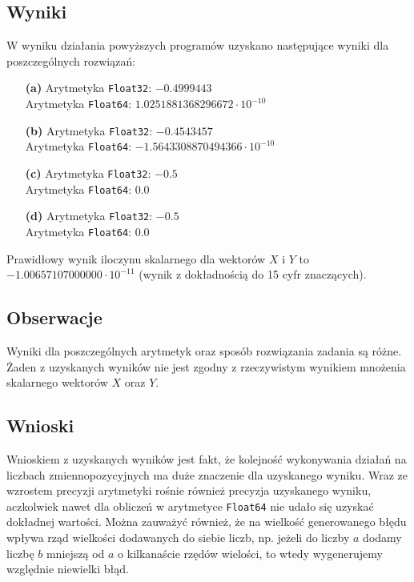 \documentclass{article}
\begin{document}
\subsection{Wyniki}
W wyniku działania powyższych programów uzyskano następujące wyniki dla poszczególnych rozwiązań:
\begin{itemize}
    \item[\textbf{(a)}] 
        Arytmetyka \texttt{Float32}: $-0.4999443$ \\
        Arytmetyka \texttt{Float64}: $1.0251881368296672 \cdot 10^{-10}$
    \item[\textbf{(b)}]
        Arytmetyka \texttt{Float32}: $-0.4543457$ \\
        Arytmetyka \texttt{Float64}: $-1.5643308870494366 \cdot 10^{-10}$
    \item[\textbf{(c)}]
        Arytmetyka \texttt{Float32}: $-0.5$ \\
        Arytmetyka \texttt{Float64}: $0.0$
    \item[\textbf{(d)}]
        Arytmetyka \texttt{Float32}: $-0.5$ \\
        Arytmetyka \texttt{Float64}: $0.0$
\end{itemize}
Prawidłowy wynik iloczynu skalarnego dla wektorów $X$ i $Y$ to $-1.00657107000000 \cdot 10^{-11}$ (wynik z dokładnością do 15 cyfr znaczących).

\subsection{Obserwacje}
Wyniki dla poszczególnych arytmetyk oraz sposób rozwiązania zadania są różne. Żaden z uzyskanych wyników nie jest zgodny z rzeczywistym wynikiem mnożenia skalarnego wektorów $X$ oraz $Y$.

\subsection{Wnioski}
Wnioskiem z uzyskanych wyników jest fakt, że kolejność wykonywania działań na liczbach zmiennopozycyjnych ma duże znaczenie dla uzyskanego wyniku. Wraz ze wzrostem precyzji arytmetyki rośnie również precyzja uzyskanego wyniku, aczkolwiek nawet dla obliczeń w arytmetyce \texttt{Float64} nie udało się uzyskać dokładnej wartości. Można zauważyć również, że na wielkość generowanego błędu wpływa rząd wielkości dodawanych do siebie liczb, np. jeżeli do liczby $a$ dodamy liczbę $b$ mniejszą od $a$ o kilkanaście rzędów wielości, to wtedy wygenerujemy względnie niewielki błąd.
\end{document}
